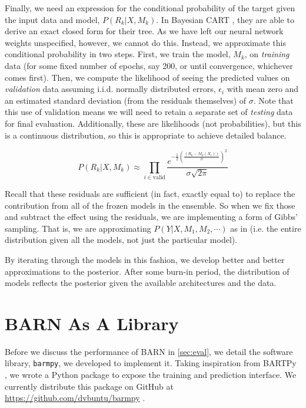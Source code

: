 \documentclass[12pt]{article}
\begin{document}
Finally, we need an expression for the conditional probability of the target given the input data and model, $P(R_k|X,M_k)$.  In Bayesian CART \cite{chipman1998bayesian}, they are able to derive an exact closed form for their tree.  As we have left our neural network weights unspecified, however, we cannot do this.  Instead, we approximate this conditional probability in two steps.  First, we train the model, $M_k$, on \emph{training} data (for some fixed number of epochs, say 200, or until convergence, whichever comes first).  Then, we compute the likelihood of seeing the predicted values on \emph{validation} data assuming i.i.d. normally distributed errors, $\epsilon_i$ with mean zero and an estimated standard deviation (from the residuals themselves) of $\sigma$.  Note that this use of validation means we will need to retain a separate set of \emph{testing} data for final evaluation.  Additionally, these are likelihoods (not probabilities), but this is a continuous distribution, so this is appropriate to achieve detailed balance.

$$
P(R_k|X,M_k) \approx \prod_{i \in \text{valid}} \frac{e^{-\frac{1}{2}\left(\frac{(R_k-M_k(X_i))}{\sigma}\right)^2}}{\sigma \sqrt{2\pi}}
$$

Recall that these residuals are sufficient (in fact, exactly equal to) to replace the contribution from all of the frozen models in the ensemble.  So when we fix those and subtract the effect using the residuals, we are implementing a form of Gibbs' sampling.  That is, we are approximating $P(Y|X,M_1,M_2,\cdots)$ as in \cite{chipman2010bart} (i.e. the entire distribution given all the models, not just the particular model).  

By iterating through the models in this fashion, we develop better and better approximations to the posterior.  After some burn-in period, the distribution of models reflects the posterior given the available architectures and the data.

\section{BARN As A Library}\label{sec:leb}

Before we discuss the performance of BARN in \autoref{sec:eval}, we detail the software library, \texttt{barmpy}, we developed to implement it.  Taking inspiration from BARTPy \cite{coltman2020bartpy}, we wrote a Python package to expose the training and prediction interface.  We currently distribute this package on GitHub at \url{https://github.com/dvbuntu/barmpy} \cite{vanboxel2023barmpy}.
\end{document}
